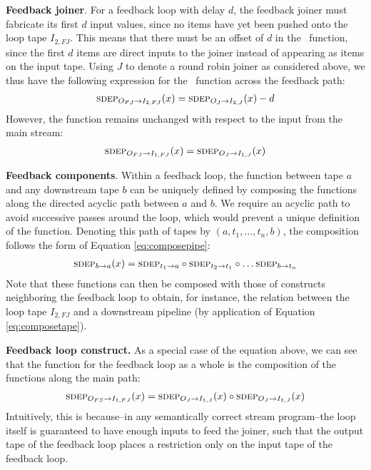 {\bf Feedback joiner}.  For a feedback loop with delay $d$, the
feedback joiner must fabricate its first $d$ input values, since no
items have yet been pushed onto the loop tape $I_{2,FJ}$.  This means
that there must be an offset of $d$ in the \sdep~function, since the
first $d$ items are direct inputs to the joiner instead of appearing
as items on the input tape.  Using $J$ to denote a round robin joiner
as considered above, we thus have the following expression for the
\sdep~function across the feedback path:
\begin{align*}
\mi{I_{2,FJ}}{O_{FJ}}(x) = \mi{I_{2,J}}{O_J}(x) - d
\end{align*}
However, the \sdep function remains unchanged with respect to the
input from the main stream:
\begin{align*}
\mi{I_{1,FJ}}{O_{FJ}}(x) = \mi{I_{1,J}}{O_J}(x)
\end{align*}

{\bf Feedback components}.  Within a feedback loop, the \sdep function
between tape $a$ and any downstream tape $b$ can be uniquely defined
by composing the \sdep functions along the directed acyclic path
between $a$ and $b$.  We require an acyclic path to avoid successive
passes around the loop, which would prevent a unique definition of the
function.  Denoting this path of tapes by $(a, t_1, \dots , t_n, b)$,
the composition follows the form of Equation \ref{eq:composepipe}:
\begin{align*}
\mi{a}{b}(x) = \mi{a}{t_1} \circ \mi{t_1}{t_2} \circ \dots \mi{t_n}{b}
\end{align*}
Note that these functions can then be composed with those of
constructs neighboring the feedback loop to obtain, for instance, the
relation between the loop tape $I_{2,FJ}$ and a downstream pipeline (by
application of Equation \ref{eq:composetape}).

{\bf Feedback loop construct.}  As a special case of the equation
above, we can see that the \sdep function for the feedback loop as a
whole is the composition of the \sdep functions along the main path:
\begin{align*}
\mi{I_{1,FJ}}{O_{FS}}(x) = \mi{I_{1,J}}{O_J}(x) \circ \mi{I_{1,J}}{O_J}(x) 
\end{align*}
Intuitively, this is because--in any semantically correct stream
program--the loop itself is guaranteed to have enough inputs to feed
the joiner, such that the output tape of the feedback loop places a
restriction only on the input tape of the feedback loop.

